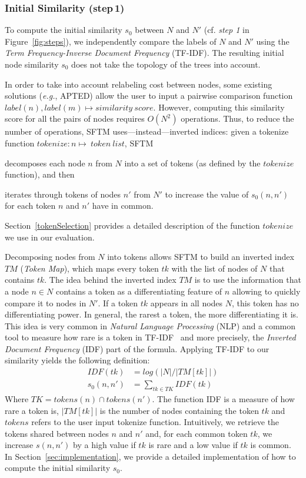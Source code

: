 \subsubsection{Initial Similarity (step\,1)}
To compute the initial similarity $s_0$ between $N$ and $N'$ (cf. \textit{step 1} in Figure~\ref{fig:steps}), we independently compare the labels of $N$ and $N'$ using the \emph{Term Frequency-Inverse Document Frequency} (TF-IDF).
The resulting initial node similarity $s_0$ does not take the topology of the trees into account.

In order to take into account relabeling cost between nodes, some existing solutions (\emph{e.g.}, APTED) allow the user to input a pairwise comparison function $label(n), label(m) \mapsto similarity\ score$.
However, computing this similarity score for all the pairs of nodes requires $O(N^2)$ operations.
Thus, to reduce the number of operations, SFTM uses---instead---inverted indices: given a tokenize function $tokenize : n \mapsto \ token\ list$, SFTM
\begin{inparaenum}
	\item decomposes each node $n$ from $N$ into a set of tokens (as defined by the $tokenize$ function), and then
    \item iterates through tokens of nodes $n'$ from $N'$ to increase the value of $s_0(n,n')$ for each token $n$ and $n'$ have in common.
\end{inparaenum}
Section~\ref{tokenSelection} provides a detailed description of the function $tokenize$ we use in our evaluation.

Decomposing nodes from $N$ into tokens allows SFTM to build an inverted index $TM$ (\emph{Token Map}), which maps every token $tk$ with the list of nodes of $N$ that contains $tk$.
The idea behind the inverted index $TM$ is to use the information that a node $n \in N$ contains a token as a differentiating feature of $n$ allowing to quickly compare it to nodes in $N'$.
If a token $tk$ appears in all nodes $N$, this token has no differentiating power.
In general, the rarest a token, the more differentiating it is.
This idea is very common in \emph{Natural Language Processing} (NLP) and a common tool to measure how rare is a token in TF-IDF~\cite{jones1972statistical} and more precisely, the \emph{Inverted Document Frequency} (IDF) part of the formula.
Applying TF-IDF to our similarity yields the following definition:
\begin{align}
	IDF(tk) &= log(|N|/|TM[tk]|) \\
	s_0(n,n') &= \sum_{tk \in TK}IDF(tk)
\end{align}
Where $TK=tokens(n) \cap tokens(n')$.
The function IDF is a measure of how rare a token is, $|TM[tk]|$ is the number of nodes containing the token $tk$ and $tokens$ refers to the user input tokenize function.
Intuitively, we retrieve the tokens shared between nodes $n$ and $n'$ and, for each common token $tk$, we increase $s(n,n')$ by a high value if $tk$ is rare and a low value if $tk$ is common.
In Section~\ref{sec:implementation}, we provide a detailed implementation of how to compute the initial similarity $s_0$.

